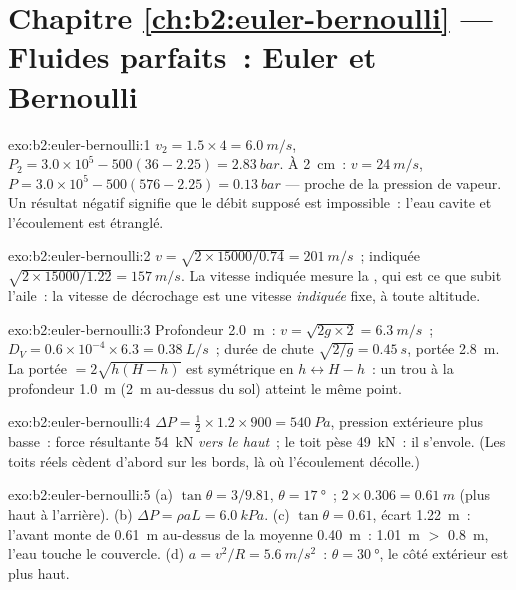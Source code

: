 \section*{Chapitre \ref{ch:b2:euler-bernoulli} --- Fluides parfaits~: Euler et Bernoulli}

\begin{solution}{exo:b2:euler-bernoulli:1}
$v_2 = 1.5 \times 4 = \qty{6.0}{m/s}$, $P_2 = 3.0 \times 10^5 - 500(36 - 2.25) =
\qty{2.83}{bar}$. À \qty{2}{cm}~: $v = \qty{24}{m/s}$, $P = 3.0 \times 10^5 - 500
(576 - 2.25) = \qty{0.13}{bar}$ --- proche de la pression de vapeur. Un résultat
négatif signifie que le débit supposé est impossible~: l'eau cavite
et l'écoulement est étranglé.
\end{solution}

\begin{solution}{exo:b2:euler-bernoulli:2}
$v = \sqrt{2 \times 15000/0.74} = \qty{201}{m/s}$~; indiquée $\sqrt{2 \times 15000/
1.22} = \qty{157}{m/s}$. La vitesse indiquée mesure la ,
qui est ce que subit l'aile~: la vitesse de décrochage est une vitesse \emph{indiquée}
fixe, à toute altitude.
\end{solution}

\begin{solution}{exo:b2:euler-bernoulli:3}
Profondeur \qty{2.0}{m}~: $v = \sqrt{2g \times 2} = \qty{6.3}{m/s}$~; $D_V = 0.6 \times 10^{-4}
\times 6.3 = \qty{0.38}{L/s}$~; durée de chute $\sqrt{2/g} = \qty{0.45}{s}$, portée
\qty{2.8}{m}. La portée $= 2\sqrt{h(H - h)}$ est symétrique en $h \leftrightarrow H -
h$~: un trou à la profondeur \qty{1.0}{m} (\qty{2}{m} au-dessus du sol) atteint le même
point.
\end{solution}

\begin{solution}{exo:b2:euler-bernoulli:4}
$\Delta P = \tfrac12 \times 1.2 \times 900 = \qty{540}{Pa}$, pression extérieure plus basse~:
force résultante \qty{54}{kN} \emph{vers le haut}~; le toit pèse \qty{49}{kN}~: il s'envole.
(Les toits réels cèdent d'abord sur les bords, là où l'écoulement décolle.)
\end{solution}

\begin{solution}{exo:b2:euler-bernoulli:5}
(a) $\tan\theta = 3/9.81$, $\theta = \qty{17}{\degree}$~; $2 \times 0.306 = \qty{0.61}{m}$
(plus haut à l'arrière). (b) $\Delta P = \rho aL = \qty{6.0}{kPa}$. (c) $\tan\theta =
0.61$, écart \qty{1.22}{m}~: l'avant monte de \qty{0.61}{m} au-dessus de la moyenne
\qty{0.40}{m}~: \qty{1.01}{m} $>$ \qty{0.8}{m}, l'eau touche le couvercle. (d) $a = v^2/R =
\qty{5.6}{m/s^2}$~: $\theta = \qty{30}{\degree}$, le côté extérieur est plus haut.
\end{solution}


